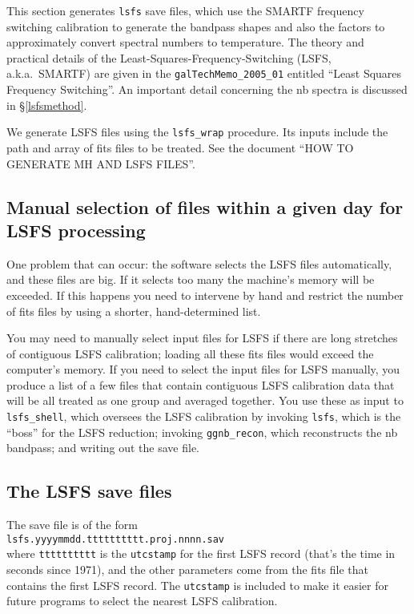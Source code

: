 \documentclass[psfig,preprint]{aastex}
\begin{document}
\label{init/lsfs1}

	This section generates \verb$lsfs$ save files, which use the
SMARTF frequency switching calibration to generate the bandpass shapes
and also the factors to approximately convert spectral numbers to
temperature. The theory and practical details of the
Least-Squares-Frequency-Switching (LSFS, a.k.a.\ SMARTF) are given in
the \verb$galTechMemo_2005_01$ entitled ``Least Squares Frequency
Switching''. An important detail concerning the nb spectra is discussed
in \S \ref{lsfsmethod}.

	We generate LSFS files using the \verb$lsfs_wrap$ procedure. 
Its inputs include the path and array of fits files to be treated.  See
the document ``HOW TO GENERATE MH AND LSFS FILES''. 

\subsection{Manual selection of files within a given day for LSFS
processing} \label{lsfsbyhand}

	One problem that can occur: the software selects the LSFS files
automatically, and these files are big.  If it selects too many the
machine's memory will be exceeded.  If this happens you need to
intervene by hand and restrict the number of fits files by using a
shorter, hand-determined list.

	You may need to manually select input files for LSFS if there
are long stretches of contiguous LSFS calibration; loading all these
fits files would exceed the computer's memory.  If you need to select
the input files for LSFS manually, you produce a list of a few files
that contain contiguous LSFS calibration data that will be all treated
as one group and averaged together.  You use these as input to
\verb$lsfs_shell$, which oversees the LSFS calibration by invoking
\verb$lsfs$, which is the ``boss'' for the LSFS reduction; invoking
\verb$ggnb_recon$, which reconstructs the nb bandpass; and writing out
the save file. 

\subsection{ The LSFS save files}

The save file is of the form \\
\verb$lsfs.yyyymmdd.tttttttttt.proj.nnnn.sav$ \\
where \verb$tttttttttt$ is the \verb$utcstamp$ for the first LSFS record
(that's the time in seconds since 1971), and the other parameters come
from the fits file that contains the first LSFS record. The
\verb$utcstamp$ is included to make it easier for future programs to
select the nearest LSFS calibration.
\end{document}
